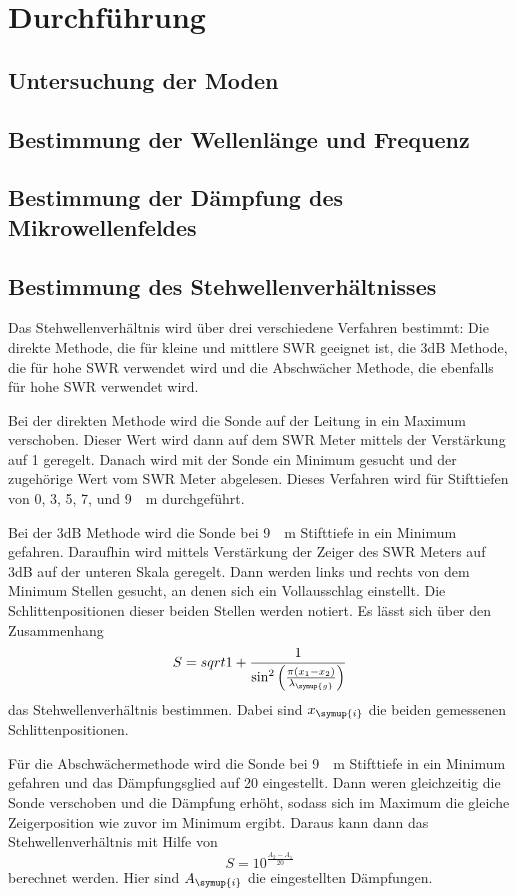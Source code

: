 \section{Durchführung}
\label{sec:Durchführung}

\subsection{Untersuchung der Moden}
\label{subsec:moden}

\subsection{Bestimmung der Wellenlänge und Frequenz}
\label{subsec:frequenz}

\subsection{Bestimmung der Dämpfung des Mikrowellenfeldes}
\label{subsec:dämpfung}

\subsection{Bestimmung des Stehwellenverhältnisses}
\label{subsec:swr}

Das Stehwellenverhältnis wird über drei verschiedene Verfahren bestimmt: Die direkte
Methode, die für kleine und mittlere SWR geeignet ist, die 3dB Methode, die für hohe
SWR verwendet wird und die Abschwächer Methode, die ebenfalls für hohe SWR verwendet
wird.

Bei der
direkten Methode wird die Sonde auf der Leitung in ein Maximum verschoben. Dieser
Wert wird dann auf dem SWR Meter mittels der Verstärkung auf 1 geregelt. Danach
wird mit der Sonde ein Minimum gesucht und der zugehörige Wert vom SWR Meter
abgelesen. Dieses Verfahren wird für Stifttiefen von 0, 3, 5, 7, und \SI{9}{\mili\metre}
durchgeführt.

Bei der 3dB Methode wird die Sonde bei \SI{9}{\mili\metre} Stifttiefe in ein
Minimum gefahren. Daraufhin wird mittels Verstärkung der Zeiger des SWR Meters auf
3dB auf der unteren Skala geregelt. Dann werden links und rechts von dem Minimum
Stellen gesucht, an denen sich ein Vollausschlag einstellt. Die Schlittenpositionen
dieser beiden Stellen werden notiert. Es lässt sich über den Zusammenhang
\begin{equation}
  S=sqrt{1+\frac{1}{\sin^2\left(\frac{\pi(x_1-x_2)}{\lambda_{\symup{g}}}\right)}}
  \label{3dB}
\end{equation}
das Stehwellenverhältnis bestimmen. Dabei sind $x_{\symup{i}}$ die beiden gemessenen
Schlittenpositionen.

Für die Abschwächermethode wird die Sonde bei \SI{9}{\mili\metre} Stifttiefe in ein
Minimum gefahren und das Dämpfungsglied auf \SI{20}{\dezibel} eingestellt. Dann
weren gleichzeitig die Sonde verschoben und die Dämpfung erhöht, sodass sich im
Maximum die gleiche Zeigerposition wie zuvor im Minimum ergibt. Daraus kann dann
das Stehwellenverhältnis mit Hilfe von
\begin{equation}
  S=10^{\frac{A_2-A_1}{20}}
  \label{abschwaecher}
\end{equation}
berechnet werden. Hier sind $A_{\symup{i}}$ die eingestellten Dämpfungen.

